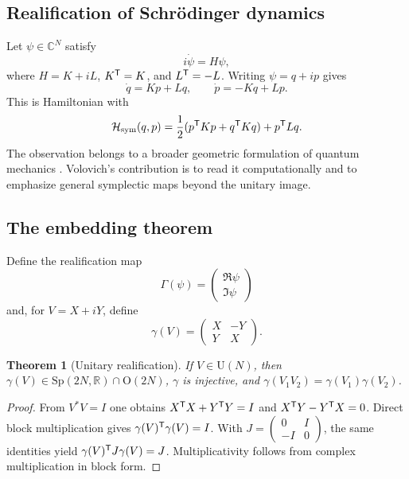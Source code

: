 \documentclass[11pt]{article}
\newtheorem{theorem}{Theorem}
\theoremstyle{definition}\newtheorem{definition}{Definition}\newtheorem{assumption}{Assumption}
\theoremstyle{remark}\newtheorem{remark}{Remark}
\newcommand{\R}{\mathbb{R}}\newcommand{\C}{\mathbb{C}}\newcommand{\E}{\mathbb{E}}
\newcommand{\Sp}{\mathrm{Sp}}\newcommand{\Orth}{\mathrm{O}}\newcommand{\U}{\mathrm{U}}
\begin{document}
\subsection{Realification of Schrödinger dynamics}
Let $\psi\in\C^N$ satisfy
\begin{equation}
i\dot\psi=H\psi,
\end{equation}
where $H=K+iL$, $K^{\mathsf T}=K$, and $L^{\mathsf T}=-L$. Writing $\psi=q+ip$ gives
\begin{equation}
\dot q=Kp+Lq,\qquad \dot p=-Kq+Lp.
\label{eq:real_schrodinger}
\end{equation}
This is Hamiltonian with
\begin{equation}
\mathcal H_{\mathrm{sym}}(q,p)=\frac12(p^{\mathsf T} Kp+q^{\mathsf T} Kq)+p^{\mathsf T} Lq.
\label{eq:vol_ham}
\end{equation}
The observation belongs to a broader geometric formulation of quantum mechanics \cite{Kibble1979,AshtekarSchilling1999}. Volovich's contribution is to read it computationally and to emphasize general symplectic maps beyond the unitary image.

\subsection{The embedding theorem}
Define the realification map
\begin{equation}
\Gamma(\psi)=\begin{pmatrix}\Re\psi\\\Im\psi\end{pmatrix}
\end{equation}
and, for $V=X+iY$, define
\begin{equation}
\gamma(V)=\begin{pmatrix}X&-Y\\Y&X\end{pmatrix}.
\end{equation}
\begin{theorem}[Unitary realification]
If $V\in\U(N)$, then $\gamma(V)\in\Sp(2N,\R)\cap\Orth(2N)$, $\gamma$ is injective, and $\gamma(V_1V_2)=\gamma(V_1)\gamma(V_2)$.
\end{theorem}
\begin{proof}
From $V^\ast V=I$ one obtains $X^{\mathsf T} X+Y^{\mathsf T} Y=I$ and $X^{\mathsf T} Y-Y^{\mathsf T} X=0$. Direct block multiplication gives $\gamma(V)^{\mathsf T}\gamma(V)=I$. With $J=\left(\begin{smallmatrix}0&I\\-I&0\end{smallmatrix}\right)$, the same identities yield $\gamma(V)^{\mathsf T} J\gamma(V)=J$. Multiplicativity follows from complex multiplication in block form.
\end{proof}
\end{document}
